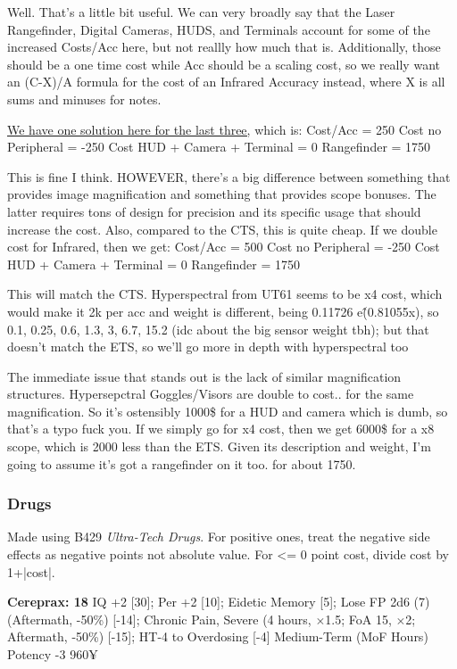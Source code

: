 \begin{multicols*}{2}
	Well. That's a little bit useful. We can very broadly say that the Laser Rangefinder, Digital Cameras, HUDS, and Terminals account for some of the increased Costs/Acc here, but not reallly how much that is. Additionally, those should be a one time cost while Acc should be a scaling cost, so we really want an (C-X)/A formula for the cost of an Infrared Accuracy instead, where X is all sums and minuses for notes.
	
	\href{https://www.wolframalpha.com/input?i=2X+%2B+P+%3D+250+%3D+X+%2B+A+when+A+%3E%3D+0%2C+P+%3C%3D+0%2C+X+%3D+250}{We have one solution here for the last three,} which is:
	Cost/Acc = 250
	Cost no Peripheral = -250
	Cost HUD + Camera + Terminal = 0
	Rangefinder = 1750
	
	This is fine I think. HOWEVER, there's a big difference between something that provides image magnification and something that provides scope bonuses. The latter requires tons of design for precision and its specific usage that should increase the cost. Also, compared to the CTS, this is quite cheap. If we double cost for Infrared, then we get:
	Cost/Acc = 500
	Cost no Peripheral = -250
	Cost HUD + Camera + Terminal = 0
	Rangefinder = 1750
	
	This will match the CTS. Hyperspectral from UT61 seems to be x4 cost, which would make it 2k per acc and weight is different, being 0.11726 e\^(0.81055x), so 0.1, 0.25, 0.6, 1.3, 3, 6.7, 15.2 (idc about the big sensor weight tbh); but that doesn't match the ETS, so we'll go more in depth with hyperspectral too
	
	The immediate issue that stands out is the lack of similar magnification structures. Hypersepctral Goggles/Visors are double to cost.. for the same magnification. So it's ostensibly 1000\$ for a HUD and camera which is dumb, so that's a typo fuck you. If we simply go for x4 cost, then we get 6000\$ for a x8 scope, which is 2000 less than the ETS. Given its description and weight, I'm going to assume it's got a rangefinder on it too. for about 1750.
	
	\subsubsection{Drugs}
	
	Made using B429 \textit{Ultra-Tech Drugs}. For positive ones, treat the negative side effects as negative points not absolute value. For <= 0 point cost, divide cost by 1+|cost|.
	
	\textbf{Cereprax: 18}
	IQ +2 [30]; Per +2 [10]; Eidetic Memory [5]; Lose FP 2d6 (7) (Aftermath, -50\%) [-14]; Chronic Pain, Severe (4 hours, $\times$1.5; FoA 15, $\times$2; Aftermath, -50\%) [-15]; HT-4 to Overdosing [-4]
	Medium-Term (MoF Hours)
	Potency -3
	960¥
	

\end{multicols*}
